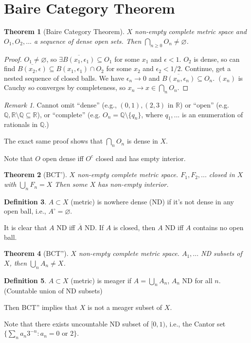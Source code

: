 \documentclass{article}
\theoremstyle{definition}
\newtheorem{defn}{Definition}[section]
\theoremstyle{remark}
\newtheorem{rem}{Remark}
\theoremstyle{plain}
\newtheorem{thm}[defn]{Theorem}
\newcommand{\QQ}{\mathbb{Q}}
\newcommand{\RR}{\mathbb{R}}
\begin{document}
\section{Baire Category Theorem}
\begin{thm}[Baire Category Theorem]
    $X$ non-empty complete metric space and $O_1,O_2,...$ a sequence of dense open sets. Then $\bigcap_{n\ge 0}O_n\neq\varnothing$.
\end{thm}
\begin{proof}
    $O_1\neq\varnothing$, so $\exists \overline{B(x_1,\epsilon_1)}\subseteq O_1$ for some $x_1$ and $\epsilon<1$. $O_2$ is dense, so can find $\overline{B(x_2,\epsilon)}\subseteq B(x_1,\epsilon_1)\cap O_2$ for some $x_2$ and $\epsilon_2<1/2$. Continue, get a nested sequence of closed balls. We have $\epsilon_n\to 0$ and $\overline{B(x_n,\epsilon_n)}\subseteq O_n$. $(x_n)$ is Cauchy so converges by completeness, so $x_n\to x\in\bigcap_nO_n$.
\end{proof}
\begin{rem}
    Cannot omit ``dense'' (e.g., $(0,1),(2,3)$ in $\RR$) or ``open'' (e.g. $\QQ,\RR\setminus\QQ\subseteq\RR$), or ``complete'' (e.g. $O_n=\QQ\setminus\{q_n\}$, where $q_1,...$ is an enumeration of rationals in $\QQ$.)

    The exact same proof shows that $\bigcap_n O_n$ is dense in $X$.
\end{rem}
Note that $O$ open dense iff $O^c$ closed and has empty interior.
\begin{thm}[BCT']
    $X$ non-empty complete metric space. $F_1,F_2,...$ closed in $X$ with $\bigcup_n F_n=X$ Then some $X$ has non-empty interior.
\end{thm}
\begin{defn}
    $A\subset X$ (metric) is nowhere dense (ND) if it's not dense in any open ball, i.e., $A^\circ=\varnothing$.
\end{defn}
It is clear that $A$ ND iff $\overline{A}$ ND. If $A$ is closed, then $A$ ND iff $A$ contains no open ball.
\begin{thm}[BCT'']
    $X$ non-empty complete metric space. $A_1,...$ ND subsets of $X$, then $\bigcup_n A_n\neq X$.
\end{thm}
\begin{defn}
    $A\subset X$ (metric) is meager if $A=\bigcup_nA_n$, $A_n$ ND for all $n$. (Countable union of ND subsets)
\end{defn}
Then BCT'' implies that $X$ is not a meager subset of $X$.

Note that there exists uncountable ND subset of $[0,1)$, i.e., the Cantor set $\{\sum_na_n3^{-n}:a_n=0\text{ or }2\}$.
\end{document}
